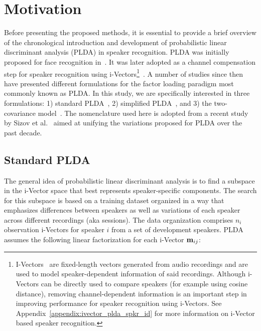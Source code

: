 \section{Motivation}
\label{sec:background}
Before presenting the proposed methods, it is essential to provide a brief overview of the chronological introduction and development of probabilistic linear discriminant analysis (PLDA) in speaker recognition. 
PLDA was initially proposed for face recognition in~\cite{prince_plda}. 
It was later adopted as a channel compensation step for speaker recognition using i-Vectors\footnote{I-Vectors~\cite{Dehak_ivector} are fixed-length vectors generated from audio recordings and are used to model speaker-dependent information of said recordings. Although i-Vectors can be directly used to compare speakers (for example using cosine distance), removing channel-dependent information is an important step in improving performance for speaker recognition using i-Vectors. See Appendix~\ref{appendix:ivector_plda_spkr_id} for more information on i-Vector based speaker recognition.}~\cite{kenny2010bayesian}. 
A number of studies since then have presented different formulations for the factor loading paradigm most commonly known as PLDA. 
In this study, we are specifically interested in three formulations: 1) standard PLDA~\cite{kenny_plda}, 2) simplified PLDA~\cite{kenny_plda2,Daniel2011is}, and 3) the two-covariance model~\cite{brummer2010twocov}. 
The nomenclature used here is adopted from a recent study by Sizov et al.~\cite{sizov2014unifying} aimed at unifying the variations proposed for PLDA over the past decade. 


\subsection{Standard PLDA}
\label{ssec:standard_plda}
The general idea of probabilistic linear discriminant analysis is to find a subspace in the i-Vector space that best represents speaker-specific components. 
The search for this subspace is based on a training dataset organized in a way that emphasizes differences between speakers as well as variations of each speaker across different recordings (aka sessions). 
The data organization comprises $n_i$ observation i-Vectors for speaker $i$ from a set of development speakers. PLDA assumes the following linear factorization for each i-Vector ${\bf m}_{ij}$: 

